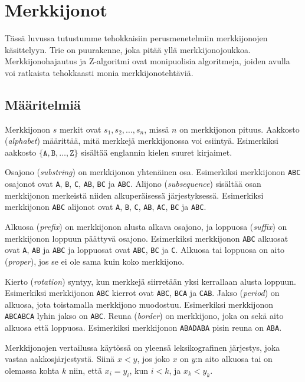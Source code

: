 \chapter{Merkkijonot}

Tässä luvussa tutustumme tehokkaisiin
perusmenetelmiin merkkijonojen käsittelyyn.
Trie on puurakenne, joka pitää
yllä merkkijonojoukkoa.
Merkkijonohajautus ja Z-algoritmi ovat monipuolisia
algoritmeja, joiden avulla voi ratkaista
tehokkaasti monia merkkijonotehtäviä.

\section{Määritelmiä}

Merkkijonon $s$ merkit ovat $s_1,s_2,\ldots,s_n$,
missä $n$ on merkkijonon pituus.
Aakkosto (\textit{alphabet})
määrittää, mitä merkkejä merkkijonossa voi esiintyä.
Esimerkiksi aakkosto $\{\texttt{A},\texttt{B},\ldots,\texttt{Z}\}$
sisältää englannin kielen suuret kirjaimet.

Osajono (\textit{substring})
on merkkijonon yhtenäinen osa.
Esimerkiksi merkkijonon \texttt{ABC} osajonot ovat
\texttt{A}, \texttt{B}, \texttt{C}, \texttt{AB}, \texttt{BC} ja \texttt{ABC}.
Alijono (\textit{subsequence})
sisältää osan merkkijonon merkeistä
niiden alkuperäisessä järjestyksessä.
Esimerkiksi merkkijonon \texttt{ABC} alijonot ovat
\texttt{A}, \texttt{B}, \texttt{C}, \texttt{AB}, \texttt{AC}, \texttt{BC} ja \texttt{ABC}.

Alkuosa (\textit{prefix}) on merkkijonon alusta alkava osajono,
ja loppuosa (\textit{suffix}) on merkkijonon loppuun päättyvä osajono.
Esimerkiksi merkkijonon \texttt{ABC} alkuosat ovat \texttt{A}, \texttt{AB} ja \texttt{ABC}
ja loppuosat ovat \texttt{ABC}, \texttt{BC} ja \texttt{C}.
Alkuosa tai loppuosa on aito (\textit{proper}),
jos se ei ole sama kuin koko merkkijono.

Kierto (\textit{rotation}) syntyy,
kun merkkejä siirretään yksi kerrallaan alusta loppuun.
Esimerkiksi merkkijonon \texttt{ABC}
kierrot ovat \texttt{ABC}, \texttt{BCA} ja \texttt{CAB}.
Jakso (\textit{period}) on alkuosa,
jota toistamalla merkkijono muodostuu.
Esimerkiksi merkkijonon \texttt{ABCABCA} lyhin jakso on \texttt{ABC}.
Reuna (\textit{border}) on
merkkijono, joka on sekä aito alkuosa
että loppuosa. Esimerkiksi merkkijonon \texttt{ABADABA}
pisin reuna on \texttt{ABA}.

Merkkijonojen vertailussa käytössä on yleensä
leksikografinen järjestys, joka vastaa aakkosjärjestystä.
Siinä $x<y$, jos joko $x$ on $y$:n aito alkuosa
tai on olemassa kohta $k$ niin,
että $x_i=y_i$, kun $i<k$, ja $x_k<y_k$.


